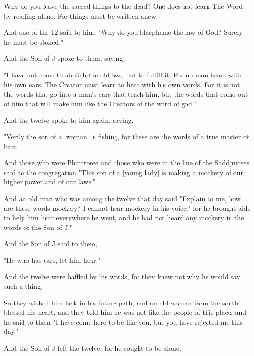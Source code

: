 \Sentence
{ \hX{} }
{ \eX{} }
{
Why do you leave the sacred things to the dead? One does not learn The Word by reading alone. For things must be written anew.
}

\Sentence
{ \hX{} }
{ \eX{} }
{
And one of the 12 said to him, "Why do you blaspheme the law of God? Surely he must be stoned."
}

\Sentence
{ \hX{} }
{ \eX{} }
{
And the Son of J spoke to them, saying,
}

\Sentence
{ \hX{} }
{ \eX{} }
{
"I have not come to abolish the old law, but to fulfill it. For no man hears with his own ears. The Creator must learn to hear with his own words. For it is not the words that go into a man's ears that teach him, but the words that come out of him that will make him like the Creators of the word of god."
}

\Sentence
{ \hX{} }
{ \eX{} }
{
And the twelve spoke to him again, saying,
}

\Sentence
{ \hX{} }
{ \eX{} }
{
"Verily the son of a [woman] is fishing, for these are the words of a true master of bait.
}

\Sentence
{ \hX{} }
{ \eX{} }
{
And those who were Phairtosee and those who were in the line of the Saddjuicees said to the congregation "This son of a [young lady] is making a mockery of our higher power and of our laws."
}

\Sentence
{ \hX{} }
{ \eX{} }
{
And an old man who was among the twelve that day said "Explain to me, how are these words mockery? I cannot hear mockery in his voice," for he brought aids to help him hear everywhere he went, and he had not heard any mockery in the words of the Son of J."
}

\Sentence
{ \hX{} }
{ \eX{} }
{
And the Son of J said to them,
}

\Sentence
{ \hX{} }
{ \eX{} }
{
"He who has ears, let him hear."
}

\Sentence
{ \hX{} }
{ \eX{} }
{
And the twelve were baffled by his words, for they knew not why he would say such a thing.
}

\Sentence
{ \hX{} }
{ \eX{} }
{
So they wished him luck in his future path, and an old woman from the south blessed his heart, and they told him he was not like the people of this place, and he said to them "I have come here to be like you, but you have rejected me this day."
}

\Sentence
{ \hX{} }
{ \eX{} }
{
And the Son of J left the twelve, for he sought to be alone.
}

